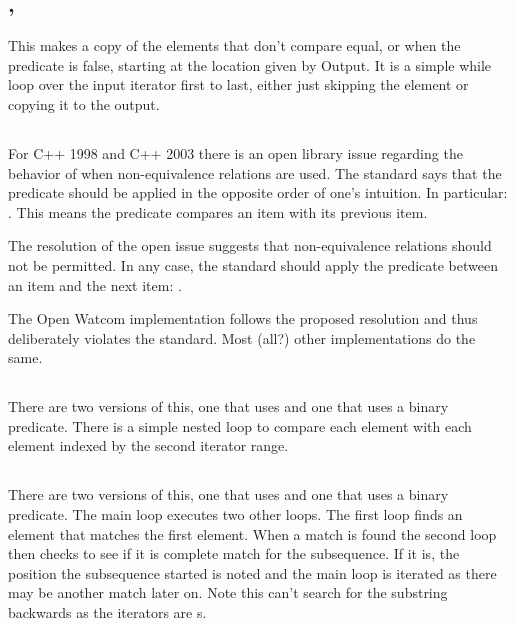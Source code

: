 \subsection[\texttt{remove\_copy}, \texttt{remove\_copy\_if}]{, }

This makes a copy of the elements that don't compare equal, or when the
predicate is false, starting at the location given by Output. It is a simple
while loop over the input iterator first to last, either just skipping the
element or copying it to the output.

\subsection[\texttt{unique}]{}

For C++ 1998 and C++ 2003 there is an open library issue regarding the
behavior of  when non-equivalence relations are used. The
standard says that the predicate should be applied in the opposite order of
one's intuition. In particular: . This means the
predicate compares an item with its previous item.

The resolution of the open issue suggests that non-equivalence relations should
not be permitted. In any case, the standard should apply the predicate between
an item and the next item: .

The Open Watcom implementation follows the proposed resolution and thus
deliberately violates the standard. Most (all?) other implementations do the
same.

\subsection[\texttt{file\_first\_of}]{}

There are two versions of this, one that uses  and one that
uses a binary predicate. There is a simple nested loop to compare each element
with each element indexed by the second iterator range.

\subsection[\texttt{find\_end}]{}

There are two versions of this, one that uses  and one that
uses a binary predicate. The main loop executes two other loops. The first
loop finds an  element that matches the first 
element. When a match is found the second loop then checks to see if it is
complete match for the subsequence. If it is, the position the subsequence
started is noted and the main loop is iterated as there may be another match
later on. Note this can't search for the substring backwards as the iterators
are s.

